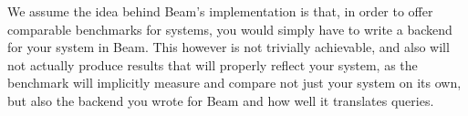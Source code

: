 We assume the idea behind Beam's implementation is that, in order to offer comparable benchmarks for systems, you would simply have to write a backend for your system in Beam. This however is not trivially achievable, and also will not actually produce results that will properly reflect your system, as the benchmark will implicitly measure and compare not just your system on its own, but also the backend you wrote for Beam and how well it translates queries. \\

